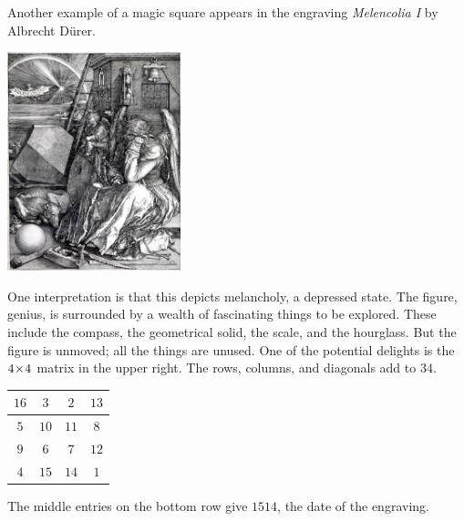 Another example of a magic square appears in the engraving
\textit{Melencolia I} by Albrecht D\"urer.
\begin{center}
  \includegraphics[height=2.5in]{Melencolia.jpg} %
\end{center}
One interpretation is that this depicts melancholy, a depressed state.
The figure, genius,
is surrounded by a wealth of fascinating things to be explored.
These include
the compass, the geometrical solid, the scale, and the hourglass.
But the figure is unmoved; all the things are unused.
One of the potential delights is the $4 \! \times \! 4$ matrix in the upper right.
The rows, columns, and diagonals add to $34$.
\begin{center}
  \qquad
  \begin{tabular}{|c|c|c|c|}
    \hline
      $16$  &$3$  &$2$  &$13$  \\ \hline
      $5$   &$10$ &$11$ &$8$   \\ \hline
      $9$   &$6$  &$7$  &$12$  \\ \hline    
      $4$   &$15$ &$14$ &$1$  \\ \hline    
  \end{tabular}
\end{center}
The middle entries on the bottom row give $1514$, the 
date of the engraving.

